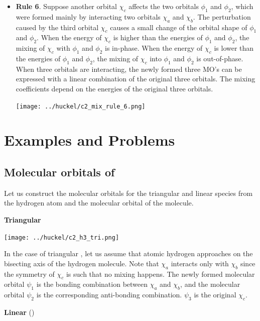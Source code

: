 \documentclass[../Main/chem532-notes.tex]{subfiles}
\begin{document}
\begin{itemize}
\item \textbf{Rule 6}.    Suppose another orbital $\chi_c$ affects the two orbitals $\phi_1$  and $\phi_2$, which were formed mainly by interacting two orbitals $\chi_a$ and $\chi_b$.   The perturbation caused by the third orbital $\chi_c$ causes a small change of the orbital shape of $\phi_1$ and $\phi_2$.   When the energy of $\chi_c$ is higher than the energies of $\phi_1$ and $\phi_2$, the mixing of $\chi_c$ with $\phi_1$ and $\phi_2$ is in-phase.   When the energy of $\chi_c$ is lower than the energies of $\phi_1$ and $\phi_2$, the mixing of $\chi_c$ into $\phi_1$ and $\phi_2$ is out-of-phase.
 When three orbitals are interacting, the newly formed three MO's can be expressed with a linear combination of the original three orbitals.   The mixing coefficients depend on the energies of the original three orbitals.

\begin{center}
\texttt{[image: ../huckel/c2\_mix\_rule\_6.png]}
\end{center}
\end{itemize}


\section{Examples and Problems}
\subsection{Molecular orbitals of }
Let us construct the molecular orbitals for the triangular and linear  species from the hydrogen atom and the molecular orbital of the  molecule. 

\textbf{Triangular }

\begin{center}
\texttt{[image: ../huckel/c2\_h3\_tri.png]}
\end{center}

 In the case of triangular , let us assume that atomic hydrogen approaches on the bisecting axis of the hydrogen molecule.
 Note that $\chi_a$ interacts only with $\chi_b$ since the symmetry of $\chi_c$ is such that no mixing happens.
 The newly formed molecular orbital $\psi_1$ is the bonding combination between $\chi_a$ and $\chi_b$, and the molecular orbital $\psi_2$ is the corresponding anti-bonding combination. $\psi_3$ is the original $\chi_c$. 

\textbf{Linear } ()
\end{document}
